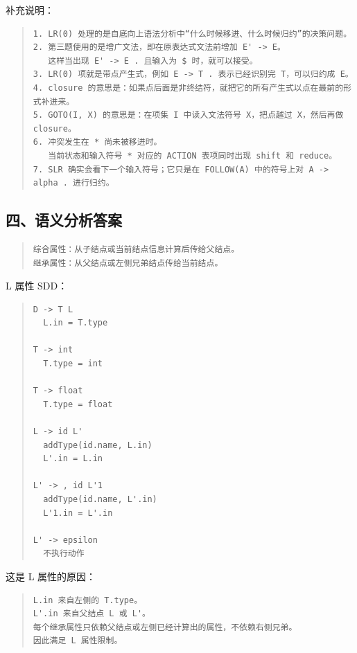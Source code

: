 \documentclass[UTF8,zihao=-4]{ctexart}
\begin{document}
补充说明：

\begin{quote}
\footnotesize
\begin{verbatim}
1. LR(0) 处理的是自底向上语法分析中“什么时候移进、什么时候归约”的决策问题。
2. 第三题使用的是增广文法，即在原表达式文法前增加 E' -> E。
   这样当出现 E' -> E . 且输入为 $ 时，就可以接受。
3. LR(0) 项就是带点产生式，例如 E -> T . 表示已经识别完 T，可以归约成 E。
4. closure 的意思是：如果点后面是非终结符，就把它的所有产生式以点在最前的形式补进来。
5. GOTO(I, X) 的意思是：在项集 I 中读入文法符号 X，把点越过 X，然后再做 closure。
6. 冲突发生在 * 尚未被移进时。
   当前状态和输入符号 * 对应的 ACTION 表项同时出现 shift 和 reduce。
7. SLR 确实会看下一个输入符号；它只是在 FOLLOW(A) 中的符号上对 A -> alpha . 进行归约。
\end{verbatim}
\end{quote}

\subsection*{四、语义分析答案}

\begin{quote}
\footnotesize
\begin{verbatim}
综合属性：从子结点或当前结点信息计算后传给父结点。
继承属性：从父结点或左侧兄弟结点传给当前结点。
\end{verbatim}
\end{quote}

L 属性 SDD：

\begin{quote}
\footnotesize
\begin{verbatim}
D -> T L
  L.in = T.type

T -> int
  T.type = int

T -> float
  T.type = float

L -> id L'
  addType(id.name, L.in)
  L'.in = L.in

L' -> , id L'1
  addType(id.name, L'.in)
  L'1.in = L'.in

L' -> epsilon
  不执行动作
\end{verbatim}
\end{quote}

这是 L 属性的原因：

\begin{quote}
\footnotesize
\begin{verbatim}
L.in 来自左侧的 T.type。
L'.in 来自父结点 L 或 L'。
每个继承属性只依赖父结点或左侧已经计算出的属性，不依赖右侧兄弟。
因此满足 L 属性限制。
\end{verbatim}
\end{quote}
\end{document}
